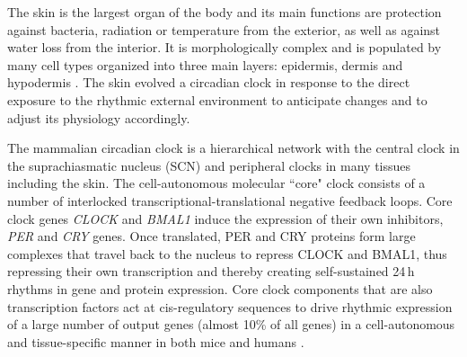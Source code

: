 The skin is the largest organ of the body and its main functions are protection against bacteria, radiation or temperature from the exterior, as well as against water loss from the interior\cite{Wong2016}. It is morphologically complex and is populated by many cell types organized into three main layers: epidermis, dermis and hypodermis \cite{Plikus2015}. The skin evolved a circadian clock \cite{Allada2021} in response to the direct exposure to the rhythmic external environment to anticipate changes and to adjust its physiology accordingly. 

\newpage

The mammalian circadian clock is a hierarchical network with the central clock in the suprachiasmatic nucleus (SCN) and peripheral clocks in many tissues including the skin. The cell-autonomous molecular ``core" clock \cite{Takahashi2017, Dibner2010} consists of a number of interlocked transcriptional-translational negative feedback loops. Core clock genes \textit{CLOCK} and \textit{BMAL1} induce the expression of their own inhibitors, \textit{PER} and \textit{CRY} genes. Once translated, PER and CRY proteins form large complexes that travel back to the nucleus to repress CLOCK and BMAL1, thus repressing their own transcription and thereby creating self-sustained 24\,h rhythms in gene and protein expression. Core clock components that are also transcription factors act at cis-regulatory sequences to drive rhythmic expression of a large number of output genes (almost 10\% of all genes) in a cell-autonomous and tissue-specific manner in both mice \cite{Zhang2014} and humans \cite{Ruben2018}.

